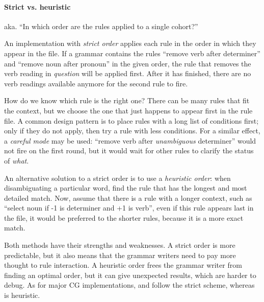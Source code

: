 \paragraph{Strict vs. heuristic}

aka. ``In which order are the rules applied to a single cohort?''

An implementation with \emph{strict order} applies each rule in the order in 
which they appear in the file. If a grammar contains the rules ``remove verb after determiner'' and ``remove noun after pronoun'' in the given order, the rule that removes the verb reading in \emph{question} will be applied first. After it has finished, there are no verb readings available anymore for the second rule to fire.
					
How do we know which rule is the right one? There can be many rules that fit the context, but we choose the one that just happens to appear first in the rule file. 
A common design pattern is to place rules with a long list of conditions first; 
only if they do not apply, then try a rule with less conditions. For a similar effect,
a \emph{careful mode} may be used: ``remove verb after \emph{unambiguous} determiner'' 
would not fire on the first round, but it would wait for other rules to clarify the
status of \emph{what}.


					
An alternative solution to a strict order is to use a \emph{heuristic order}: when disambiguating a particular word, find the rule that has the longest and most detailed match. Now, assume that there is a rule with a longer context, such as ``select noun if -1 is determiner and +1 is verb'', even if this rule appears last in the file, it would be preferred to the shorter rules, because it is a more exact match.
					
Both methods have their strengths and weaknesses. A strict order is more predictable, but it also means that the grammar writers need to pay more thought to rule interaction. A heuristic order frees the grammar writer from finding an optimal order, but it can give unexpected results, which are harder to debug.
As for major CG implementations, \cite{karlsson1990cgp} and \cite{vislcg3} follow the strict scheme, whereas \cite{tapanainen1996} is heuristic.


